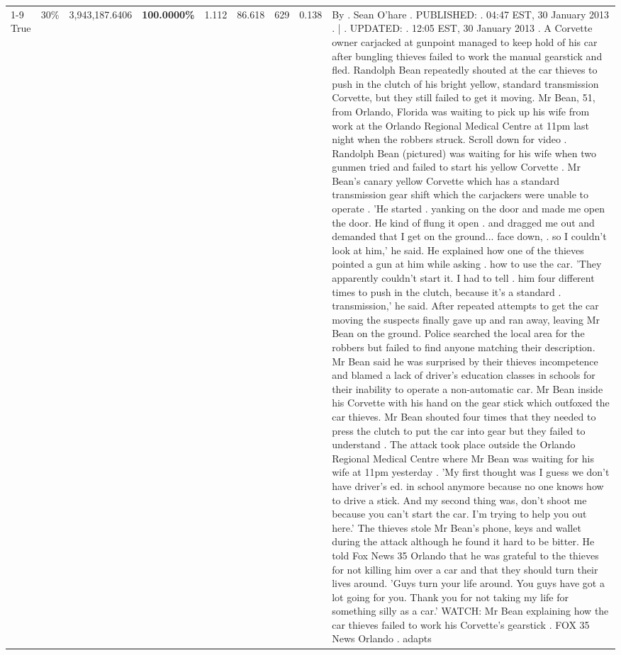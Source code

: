 \begin{table}[H]
\begin{tabular}{lllrlllll}
\cline{1-9} \cline{2-9}
True & 30\% & 3,943,187.6406 & \bfseries \color{red} 100.0000\% & 1.112 & 86.618 & 629 & 0.138 & By . Sean O'hare . PUBLISHED: . 04:47 EST, 30 January 2013 . | . UPDATED: . 12:05 EST, 30 January 2013 . A Corvette owner carjacked at gunpoint managed to keep hold of his car after bungling thieves failed to work the manual gearstick and fled. Randolph Bean repeatedly shouted at the car thieves to push in the clutch of his bright yellow, standard transmission Corvette, but they still failed to get it moving. Mr Bean, 51, from Orlando, Florida was waiting to pick up his wife from work at the Orlando Regional Medical Centre at 11pm last night when the robbers struck. Scroll down for video . Randolph Bean (pictured) was waiting for his wife when two gunmen tried and failed to start his yellow Corvette . Mr Bean's canary yellow Corvette which has a standard transmission gear shift which the carjackers were unable to operate . 'He started . yanking on the door and made me open the door. He kind of flung it open . and dragged me out and demanded that I get on the ground... face down, . so I couldn't look at him,' he said. He explained how one of the thieves pointed a gun at him while asking . how to use the car. 'They apparently couldn't start it. I had to tell . him four different times to push in the clutch, because it's a standard . transmission,' he said. After repeated attempts to get the car moving the suspects finally gave up and ran away, leaving Mr Bean on the ground. Police searched the local area for the robbers but failed to find anyone matching their description. Mr Bean said he was surprised by their thieves incompetence and blamed a lack of driver's education classes in schools for their inability to operate a non-automatic car. Mr Bean inside his Corvette with his hand on the gear stick which outfoxed the car thieves. Mr Bean shouted four times that they needed to press the clutch to put the car into gear but they failed to understand . The attack took place outside the Orlando Regional Medical Centre where Mr Bean was waiting for his wife at 11pm yesterday . 'My first thought was I guess we don't have driver's ed. in school anymore because no one knows how to drive a stick. And my second thing was, don't shoot me because you can't start the car. I'm trying to help you out here.' The thieves stole Mr Bean's phone, keys and wallet during the attack although he found it hard to be bitter. He told Fox News 35 Orlando that he was grateful to the thieves for not killing him over a car and that they should turn their lives around. 'Guys turn your life around. You guys have got a lot going for you. Thank you for not taking my life for something silly as a car.' WATCH: Mr Bean explaining how the car thieves failed to work his Corvette's gearstick . FOX 35 News Orlando . adapts \\

\end{tabular}
\end{table}
